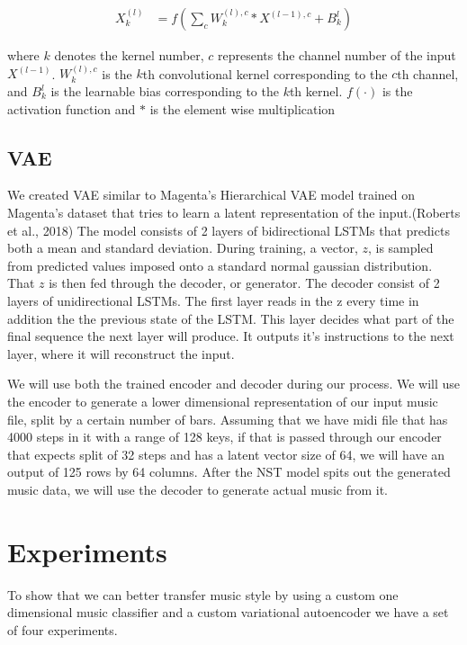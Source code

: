 \documentclass{article}
\begin{document}
\begin{equation} 
\begin{split}
	X_k^{(l)} & = f(\sum_c W_k^{(l),c} * X^{(l-1), c} + B_k^l)
\end{split} 
\end{equation}

where $k$ denotes the kernel number, $c$ represents the channel number of the input $X^{(l-1)}$. $W_k^{(l),c}$ is the $k$th convolutional kernel corresponding to the $c$th channel, and $B_k^l$ is the learnable bias corresponding to the $k$th kernel. $f(\cdot)$ is the activation function and $*$ is the element wise multiplication


\subsection{VAE}

We created VAE similar to Magenta's Hierarchical VAE model trained on Magenta’s dataset that tries to learn a latent representation of the input.(Roberts et al., 2018)  The model consists of 2 layers of bidirectional LSTMs that predicts both a mean and standard deviation. During training, a vector, $z$,  is sampled from predicted values imposed onto a standard normal gaussian distribution. That $z$ is then fed through the decoder, or generator. The decoder consist of 2 layers of unidirectional LSTMs. The first layer reads in the z every time in addition the the previous state of the LSTM. This layer decides what part of the final sequence the next layer will produce. It outputs it's instructions to the next layer, where it will reconstruct the input.

We will use both the trained encoder and decoder during our process. We will use the encoder to generate a lower dimensional representation of our input music file, split by a certain number of bars. Assuming that we have midi file that has 4000 steps in it with a range of 128 keys, if that is passed through our encoder that expects split of 32 steps and has a latent vector size of 64, we will have an output of 125 rows by 64 columns. After the NST model spits out the generated music data, we will use the decoder to generate actual music from it. 


\section{Experiments}
\label{experiments}

To show that we can better transfer music style by using a custom one dimensional music classifier and a custom variational autoencoder we have a set of four experiments. 
\end{document}
